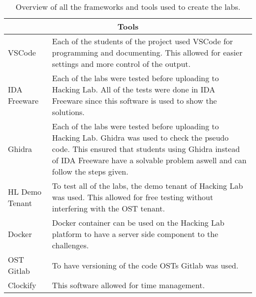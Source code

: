 \begin{center}
    \begin{table}[H]
        \centering
        \begin{tabular}{ |p{4.1cm}|p{10cm}| } 
            \hline
            \multicolumn{2}{||c||}{\textbf{Tools}} \\
            \hline
            \hline
                VSCode & Each of the students of the project used VSCode for programming and documenting. This allowed for easier settings and more control of the output. \\
            \hline
                IDA Freeware & Each of the labs were tested before uploading to Hacking Lab. All of the tests were done in IDA Freeware since this software is used to show the solutions.  \\
            \hline
                Ghidra & Each of the labs were tested before uploading to Hacking Lab. Ghidra was used to check the pseudo code. This ensured that students using Ghidra instead of IDA Freeware have a solvable problem aswell and can follow the steps given. \\
            \hline
                HL Demo Tenant & 
                To test all of the labs, the demo tenant of Hacking Lab was used. This allowed for free testing without interfering with the OST tenant.  \\ 
            \hline
                Docker & Docker container can be used on the Hacking Lab platform to have a server side component to the challenges. \\
            \hline
                OST Gitlab & 
                To have versioning of the code OSTs Gitlab was used.  \\ 
            \hline
                Clockify & 
                This software allowed for time management. \\ 
            \hline
        \end{tabular}
        \caption{Overview of all the frameworks and tools used to create the labs.}
        \label{tab:tools}
    \end{table}
\end{center}

